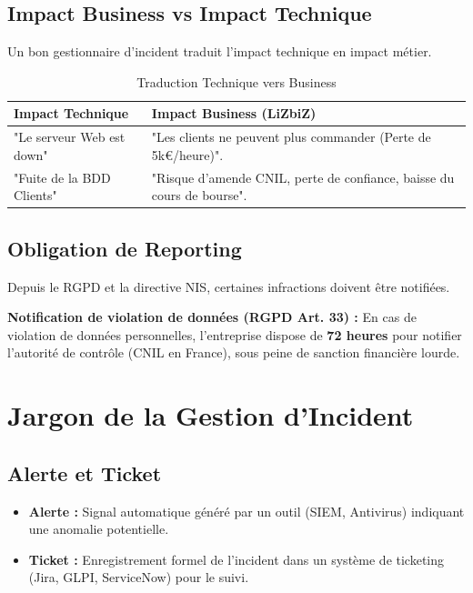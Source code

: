\subsection{Impact Business vs Impact Technique}

Un bon gestionnaire d'incident traduit l'impact technique en impact métier.

\begin{table}[htbp]
\centering
\begin{tabular}{p{4cm}p{4cm}}
    \toprule
    \textbf{Impact Technique} & \textbf{Impact Business (LiZbiZ)} \\
    \midrule
    "Le serveur Web est down" & "Les clients ne peuvent plus commander (Perte de 5k€/heure)". \\
    "Fuite de la BDD Clients" & "Risque d'amende CNIL, perte de confiance, baisse du cours de bourse". \\
    \bottomrule
\end{tabular}
\caption{Traduction Technique vers Business}
\end{table}

\subsection{Obligation de Reporting}

Depuis le RGPD et la directive NIS, certaines infractions doivent être notifiées.

\begin{boxdef}
\textbf{Notification de violation de données (RGPD Art. 33) :} En cas de violation de données personnelles, l'entreprise dispose de \textbf{72 heures} pour notifier l'autorité de contrôle (CNIL en France), sous peine de sanction financière lourde.
\end{boxdef}

\section{Jargon de la Gestion d'Incident}

\subsection{Alerte et Ticket}

\begin{itemize}
    \item \textbf{Alerte :} Signal automatique généré par un outil (SIEM, Antivirus) indiquant une anomalie potentielle.
    \item \textbf{Ticket :} Enregistrement formel de l'incident dans un système de ticketing (Jira, GLPI, ServiceNow) pour le suivi.
\end{itemize}

